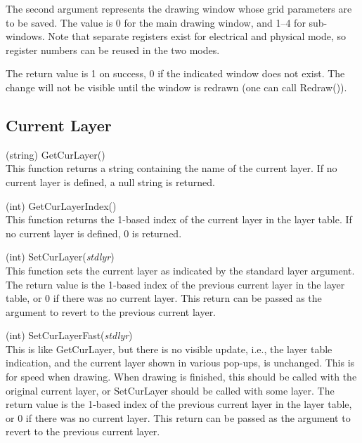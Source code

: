 \begin{description}
The second argument represents the drawing window whose grid
parameters are to be saved.  The value is 0 for the main drawing
window, and 1--4 for sub-windows.  Note that separate registers exist
for electrical and physical mode, so register numbers can be reused in
the two modes.

The return value is 1 on success, 0 if the indicated window does not
exist.  The change will not be visible until the window is redrawn
(one can call {\vt Redraw()}).

\end{description}


\subsection{Current Layer}

\begin{description}
\item{(string) \vt GetCurLayer()}\\
This function returns a string containing the name of the current
layer.  If no current layer is defined, a null string is returned.

\item{(int) \vt GetCurLayerIndex()}\\
This function returns the 1-based index of the current layer in the
layer table.  If no current layer is defined, 0 is returned.

\item{(int) \vt SetCurLayer({\it stdlyr\/})}\\
This function sets the current layer as indicated by the standard
layer argument.  The return value is the 1-based index of the previous
current layer in the layer table, or 0 if there was no current layer. 
This return can be passed as the argument to revert to the previous
current layer.

\item{(int) \vt SetCurLayerFast({\it stdlyr\/})}\\
This is like {\vt GetCurLayer}, but there is no visible update, i.e.,
the layer table indication, and the current layer shown in various
pop-ups, is unchanged.  This is for speed when drawing.  When drawing
is finished, this should be called with the original current layer, or
{\vt SetCurLayer} should be called with some layer.  The return value
is the 1-based index of the previous current layer in the layer table,
or 0 if there was no current layer.  This return can be passed as the
argument to revert to the previous current layer. 


\end{description}
